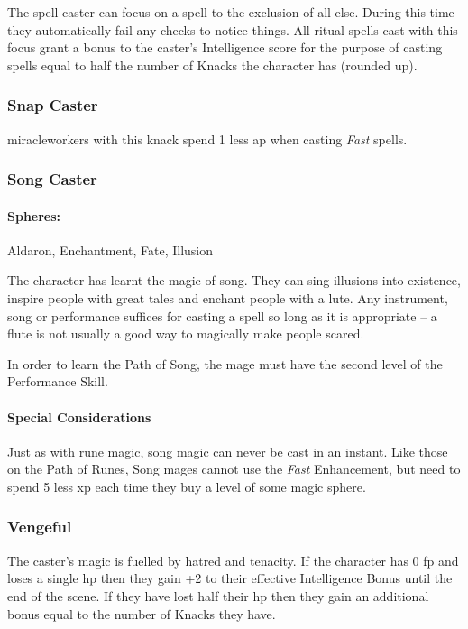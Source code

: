 \begin{multicols}{2}
The spell caster can focus on a spell to the exclusion of all else.
During this time they automatically fail any checks to notice things.
All ritual spells cast with this focus grant a bonus to the caster's Intelligence score for the purpose of casting spells equal to half the number of Knacks the character has (rounded up).

\subsubsection{Snap Caster}

\iftoggle{verbose}{
  The character is particularly adept at casting spells quickly, and therefore in Combat.
}{}
\Glspl{miracleworker} with this knack spend 1 less \gls{ap} when casting \textit{Fast} spells.

\subsubsection{Song Caster}
\paragraph{Spheres:} Aldaron, Enchantment, Fate, Illusion

The character has learnt the magic of song. They can sing illusions into existence, inspire people with great tales and enchant people with a lute. Any instrument, song or performance suffices for casting a spell so long as it is appropriate -- a flute is not usually a good way to magically make people scared.

In order to learn the Path of Song, the mage must have the second level of the Performance Skill. 

\paragraph{Special Considerations}

Just as with rune magic, song magic can never be cast in an instant.
Like those on the Path of Runes, Song mages cannot use the \textit{Fast} Enhancement, but need to spend 5 less \gls{xp} each time they buy a level of some magic sphere.

\subsubsection{Vengeful}

The caster's magic is fuelled by hatred and tenacity.
If the character has 0 \gls{fp} and loses a single \gls{hp} then they gain +2 to their effective Intelligence Bonus until the end of the scene.
If they have lost half their \gls{hp} then they gain an additional bonus equal to the number of Knacks they have.


\end{multicols}
